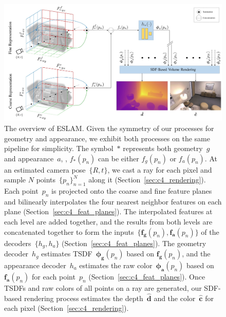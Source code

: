 \begin{figure}[t]
    \begin{center}
        \includegraphics[width=1.0\linewidth]{images/chapter4/figures/Fig2.jpg}
    \end{center}
    \caption{The overview of ESLAM. Given the symmetry of our processes for geometry and appearance, we exhibit both processes on the same pipeline for simplicity. The symbol~$*$ represents both geometry~$g$ and appearance~$a$, \eg, $f_{*}(p_{n})$ can be either $f_{g}(p_{n})$ or $f_{a}(p_{n})$. At an estimated camera pose~$\{R,t\}$, we cast a ray for each pixel and sample $N$ points~$\{p_{n}\}_{n=1}^{N}$ along it (Section~\ref{sec:c4_rendering}). Each point~$p_{n}$ is projected onto the coarse and fine feature planes and bilinearly interpolates the four nearest neighbor features on each plane (Section~\ref{sec:c4_feat_planes}). The interpolated features at each level are added together, and the results from both levels are concatenated together to form the inputs~$\{\boldsymbol{f_{g}}(p_{n}), \boldsymbol{f_{a}}(p_{n})\}$ of the decoders~$\{h_{g}, h_{a}\}$ (Section~\ref{sec:c4_feat_planes}). The geometry decoder~$h_{g}$ estimates TSDF~$\boldsymbol{\phi_{g}}(p_{n})$ based on $\boldsymbol{f_{g}}(p_{n})$, and the appearance decoder~$h_{a}$ estimates the raw color~$\boldsymbol{\phi_{a}}(p_{n})$ based on $\boldsymbol{f_{a}}(p_{n})$ for each point~$p_{n}$ (Section~\ref{sec:c4_feat_planes}). Once TSDFs and raw colors of all points on a ray are generated, our SDF-based rendering process estimates the depth~$\boldsymbol{\hat{d}}$ and the color~$\boldsymbol{\hat{c}}$ for each pixel (Section~\ref{sec:c4_rendering}).
   }
    \label{fig:c4_arch}
\end{figure}

